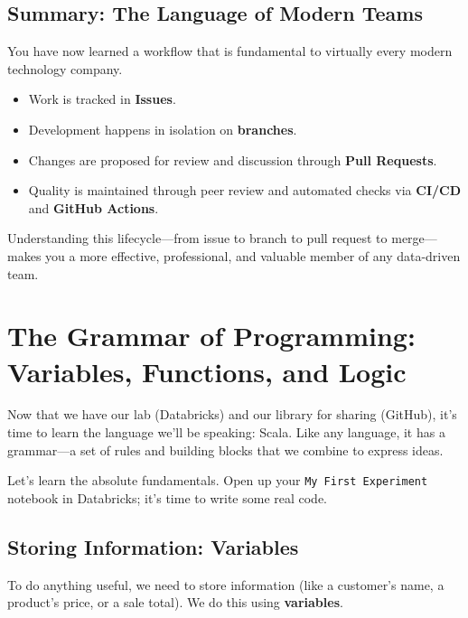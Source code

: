 \documentclass[
  letterpaper,
  DIV=11,
  numbers=noendperiod]{scrreprt}
\providecommand{\tightlist}{%
  \setlength{\itemsep}{0pt}\setlength{\parskip}{0pt}}
\begin{document}
\section{Summary: The Language of Modern
Teams}\label{summary-the-language-of-modern-teams}

You have now learned a workflow that is fundamental to virtually every
modern technology company.

\begin{itemize}
\tightlist
\item
  Work is tracked in \textbf{Issues}.
\item
  Development happens in isolation on \textbf{branches}.
\item
  Changes are proposed for review and discussion through \textbf{Pull
  Requests}.
\item
  Quality is maintained through peer review and automated checks via
  \textbf{CI/CD} and \textbf{GitHub Actions}.
\end{itemize}

Understanding this lifecycle---from issue to branch to pull request to
merge---makes you a more effective, professional, and valuable member of
any data-driven team.


\chapter{The Grammar of Programming: Variables, Functions, and
Logic}\label{the-grammar-of-programming-variables-functions-and-logic}

Now that we have our lab (Databricks) and our library for sharing
(GitHub), it's time to learn the language we'll be speaking: Scala. Like
any language, it has a grammar---a set of rules and building blocks that
we combine to express ideas.

Let's learn the absolute fundamentals. Open up your
\texttt{My\ First\ Experiment} notebook in Databricks; it's time to
write some real code.

\section{Storing Information:
Variables}\label{storing-information-variables}

To do anything useful, we need to store information (like a customer's
name, a product's price, or a sale total). We do this using
\textbf{variables}.
\end{document}
